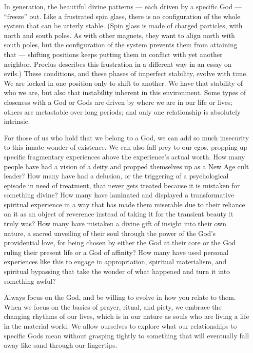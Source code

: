 \documentclass[
]{book}
\begin{document}
In generation, the beautiful divine patterns --- each driven by a specific God --- ``freeze'' out. Like a frustrated spin glass, there is no configuration of the whole system that can be utterly stable. (Spin glass is made of charged particles, with north and south poles. As with other magnets, they want to align north with south poles, but the configuration of the system prevents them from attaining that --- shifting positions keeps putting them in conflict with yet another neighbor. Proclus describes this frustration in a different way in an essay on evils.) These conditions, and these phases of imperfect stability, evolve with time. We are locked in one position only to shift to another. We have that stability of who we are, but also that instability inherent in this environment. Some types of closeness with a God or Gods are driven by where we are in our life or lives; others are metastable over long periods; and only one relationship is absolutely intrinsic.

For those of us who hold that we belong to a God, we can add so much insecurity to this innate wonder of existence. We can also fall prey to our egos, propping up specific fragmentary experiences above the experience's actual worth. How many people have had a vision of a deity and propped themselves up as a New Age cult leader? How many have had a delusion, or the triggering of a psychological episode in need of treatment, that never gets treated because it is mistaken for something divine? How many have laminated and displayed a transformative spiritual experience in a way that has made them miserable due to their reliance on it as an object of reverence instead of taking it for the transient beauty it truly was? How many have mistaken a divine gift of insight into their own nature, a sacred unveiling of their soul through the power of the God's providential love, for being chosen by either the God at their core or the God ruling their present life or a God of affinity? How many have used personal experiences like this to engage in appropriation, spiritual materialism, and spiritual bypassing that take the wonder of what happened and turn it into something awful?

Always focus on the God, and be willing to evolve in how you relate to them. When we focus on the basics of prayer, ritual, and piety, we embrace the changing rhythms of our lives, which is in our nature as souls who are living a life in the material world. We allow ourselves to explore what our relationships to specific Gods mean without grasping tightly to something that will eventually fall away like sand through our fingertips.
\end{document}

